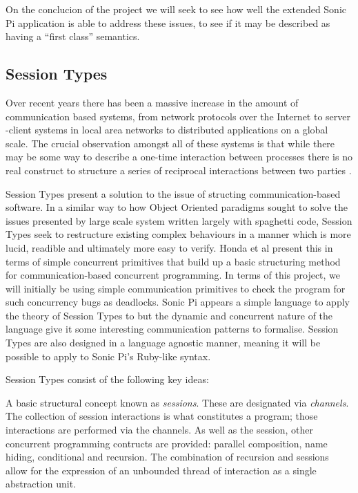 \documentclass[11pt]{scrartcl}
\begin{document}
On the conclucion of the project we will seek to see how well the extended Sonic 
Pi application is able to address these issues, to see if it may be described as 
having a ``first class'' semantics.

\subsection{Session Types}
Over recent years there has been a massive increase in the amount of 
communication based systems, from network protocols over the Internet to server
-client systems in local area networks to distributed applications on a global 
scale. The crucial observation amongst all of these systems is that while 
there may be some way to describe a one-time interaction between processes 
there is no real construct to structure a series of reciprocal interactions 
between two parties \cite{HVM98}.

Session Types present a solution to the issue of structing communication-based 
software. In a similar way to how Object Oriented paradigms sought to solve 
the issues presented by large scale system written largely with spaghetti 
code, Session Types seek to restructure existing complex behaviours in a 
manner which is more lucid, readible and ultimately more easy to verify. Honda 
et al \cite{HVM98} present this in terms of simple concurrent primitives that 
build up a basic structuring method for communication-based concurrent 
programming. In terms of this project, we will initially be using simple 
communication primitives to check the program for such concurrency bugs as 
deadlocks. Sonic Pi appears a simple language to apply the theory of Session 
Types to but the dynamic and concurrent nature of the language give it some 
interesting communication patterns to formalise. Session Types 
are also designed in a language agnostic manner, meaning it will be possible to 
apply to Sonic Pi's Ruby-like syntax.

Session Types consist of the following key ideas:

A basic structural concept known as \emph{sessions}. These are designated via 
\emph{channels}. The collection of session interactions is what constitutes a 
program; those interactions are performed via the channels. As well as the 
session, other concurrent programming contructs are provided: parallel 
composition, name hiding, conditional and recursion. The combination of 
recursion and sessions allow for the expression of an unbounded thread of 
interaction as a single abstraction unit.
\end{document}
